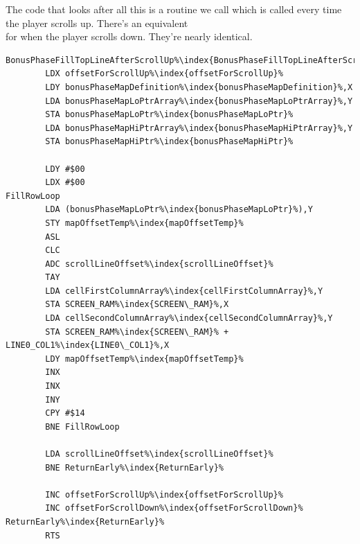 The code that looks after all this is a routine we call 
which is called every time the player scrolls up. There's an equivalent \\
for when the player scrolls down. They're nearly identical.

\begin{minipage}[b]{0.45\linewidth}
\centering
\begin{lstlisting}[basicstyle=\tiny\ttfamily,escapechar=\%]
BonusPhaseFillTopLineAfterScrollUp%\index{BonusPhaseFillTopLineAfterScrollUp}%   
        LDX offsetForScrollUp%\index{offsetForScrollUp}%
        LDY bonusPhaseMapDefinition%\index{bonusPhaseMapDefinition}%,X
        LDA bonusPhaseMapLoPtrArray%\index{bonusPhaseMapLoPtrArray}%,Y
        STA bonusPhaseMapLoPtr%\index{bonusPhaseMapLoPtr}%
        LDA bonusPhaseMapHiPtrArray%\index{bonusPhaseMapHiPtrArray}%,Y
        STA bonusPhaseMapHiPtr%\index{bonusPhaseMapHiPtr}%

        LDY #$00
        LDX #$00
FillRowLoop
        LDA (bonusPhaseMapLoPtr%\index{bonusPhaseMapLoPtr}%),Y
        STY mapOffsetTemp%\index{mapOffsetTemp}%
        ASL 
        CLC 
        ADC scrollLineOffset%\index{scrollLineOffset}%
        TAY 
        LDA cellFirstColumnArray%\index{cellFirstColumnArray}%,Y
        STA SCREEN_RAM%\index{SCREEN\_RAM}%,X
        LDA cellSecondColumnArray%\index{cellSecondColumnArray}%,Y
        STA SCREEN_RAM%\index{SCREEN\_RAM}% + LINE0_COL1%\index{LINE0\_COL1}%,X
        LDY mapOffsetTemp%\index{mapOffsetTemp}%
        INX 
        INX 
        INY 
        CPY #$14
        BNE FillRowLoop

        LDA scrollLineOffset%\index{scrollLineOffset}%
        BNE ReturnEarly%\index{ReturnEarly}%

        INC offsetForScrollUp%\index{offsetForScrollUp}%
        INC offsetForScrollDown%\index{offsetForScrollDown}%
ReturnEarly%\index{ReturnEarly}%
        RTS 
\end{lstlisting}
\end{minipage}
\hspace{0.5cm}
